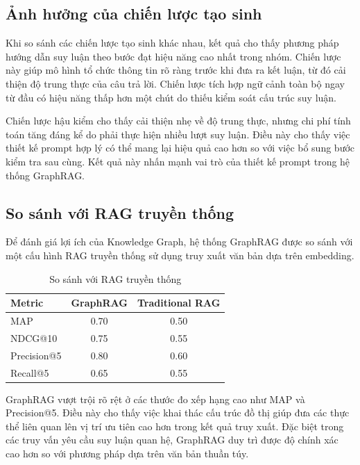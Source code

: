 \subsection{Ảnh hưởng của chiến lược tạo sinh}

Khi so sánh các chiến lược tạo sinh khác nhau, kết quả cho thấy phương pháp hướng dẫn suy luận theo bước đạt hiệu năng cao nhất trong nhóm. Chiến lược này giúp mô hình tổ chức thông tin rõ ràng trước khi đưa ra kết luận, từ đó cải thiện độ trung thực của câu trả lời. Chiến lược tích hợp ngữ cảnh toàn bộ ngay từ đầu có hiệu năng thấp hơn một chút do thiếu kiểm soát cấu trúc suy luận.

Chiến lược hậu kiểm cho thấy cải thiện nhẹ về độ trung thực, nhưng chi phí tính toán tăng đáng kể do phải thực hiện nhiều lượt suy luận. Điều này cho thấy việc thiết kế prompt hợp lý có thể mang lại hiệu quả cao hơn so với việc bổ sung bước kiểm tra sau cùng. Kết quả này nhấn mạnh vai trò của thiết kế prompt trong hệ thống GraphRAG.

\subsection{So sánh với RAG truyền thống}

Để đánh giá lợi ích của Knowledge Graph, hệ thống GraphRAG được so sánh với một cấu hình RAG truyền thống sử dụng truy xuất văn bản dựa trên embedding.

\begin{table}[h]
\centering
\caption{So sánh với RAG truyền thống}
\label{tab:baseline_results}
\begin{tabular}{lcc}
\hline
\textbf{Metric} & \textbf{GraphRAG} & \textbf{Traditional RAG} \\
\hline
MAP & 0.70 & 0.50 \\
NDCG@10 & 0.75 & 0.55 \\
Precision@5 & 0.80 & 0.60 \\
Recall@5 & 0.65 & 0.55 \\
\hline
\end{tabular}
\end{table}

GraphRAG vượt trội rõ rệt ở các thước đo xếp hạng cao như MAP và Precision@5. Điều này cho thấy việc khai thác cấu trúc đồ thị giúp đưa các thực thể liên quan lên vị trí ưu tiên cao hơn trong kết quả truy xuất. Đặc biệt trong các truy vấn yêu cầu suy luận quan hệ, GraphRAG duy trì được độ chính xác cao hơn so với phương pháp dựa trên văn bản thuần túy.

